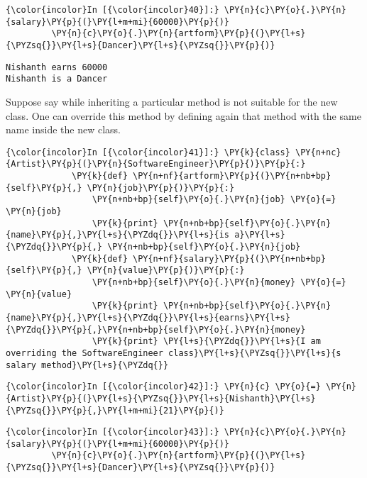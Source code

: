     \begin{Verbatim}[commandchars=\\\{\}]
{\color{incolor}In [{\color{incolor}40}]:} \PY{n}{c}\PY{o}{.}\PY{n}{salary}\PY{p}{(}\PY{l+m+mi}{60000}\PY{p}{)}
         \PY{n}{c}\PY{o}{.}\PY{n}{artform}\PY{p}{(}\PY{l+s}{\PYZsq{}}\PY{l+s}{Dancer}\PY{l+s}{\PYZsq{}}\PY{p}{)}
\end{Verbatim}

    \begin{Verbatim}[commandchars=\\\{\}]
Nishanth earns 60000
Nishanth is a Dancer
    \end{Verbatim}

    Suppose say while inheriting a particular method is not suitable for the
new class. One can override this method by defining again that method
with the same name inside the new class.

    \begin{Verbatim}[commandchars=\\\{\}]
{\color{incolor}In [{\color{incolor}41}]:} \PY{k}{class} \PY{n+nc}{Artist}\PY{p}{(}\PY{n}{SoftwareEngineer}\PY{p}{)}\PY{p}{:}
             \PY{k}{def} \PY{n+nf}{artform}\PY{p}{(}\PY{n+nb+bp}{self}\PY{p}{,} \PY{n}{job}\PY{p}{)}\PY{p}{:}
                 \PY{n+nb+bp}{self}\PY{o}{.}\PY{n}{job} \PY{o}{=} \PY{n}{job}
                 \PY{k}{print} \PY{n+nb+bp}{self}\PY{o}{.}\PY{n}{name}\PY{p}{,}\PY{l+s}{\PYZdq{}}\PY{l+s}{is a}\PY{l+s}{\PYZdq{}}\PY{p}{,} \PY{n+nb+bp}{self}\PY{o}{.}\PY{n}{job}
             \PY{k}{def} \PY{n+nf}{salary}\PY{p}{(}\PY{n+nb+bp}{self}\PY{p}{,} \PY{n}{value}\PY{p}{)}\PY{p}{:}
                 \PY{n+nb+bp}{self}\PY{o}{.}\PY{n}{money} \PY{o}{=} \PY{n}{value}
                 \PY{k}{print} \PY{n+nb+bp}{self}\PY{o}{.}\PY{n}{name}\PY{p}{,}\PY{l+s}{\PYZdq{}}\PY{l+s}{earns}\PY{l+s}{\PYZdq{}}\PY{p}{,}\PY{n+nb+bp}{self}\PY{o}{.}\PY{n}{money}
                 \PY{k}{print} \PY{l+s}{\PYZdq{}}\PY{l+s}{I am overriding the SoftwareEngineer class}\PY{l+s}{\PYZsq{}}\PY{l+s}{s salary method}\PY{l+s}{\PYZdq{}}
\end{Verbatim}

    \begin{Verbatim}[commandchars=\\\{\}]
{\color{incolor}In [{\color{incolor}42}]:} \PY{n}{c} \PY{o}{=} \PY{n}{Artist}\PY{p}{(}\PY{l+s}{\PYZsq{}}\PY{l+s}{Nishanth}\PY{l+s}{\PYZsq{}}\PY{p}{,}\PY{l+m+mi}{21}\PY{p}{)}
\end{Verbatim}

    \begin{Verbatim}[commandchars=\\\{\}]
{\color{incolor}In [{\color{incolor}43}]:} \PY{n}{c}\PY{o}{.}\PY{n}{salary}\PY{p}{(}\PY{l+m+mi}{60000}\PY{p}{)}
         \PY{n}{c}\PY{o}{.}\PY{n}{artform}\PY{p}{(}\PY{l+s}{\PYZsq{}}\PY{l+s}{Dancer}\PY{l+s}{\PYZsq{}}\PY{p}{)}
\end{Verbatim}

